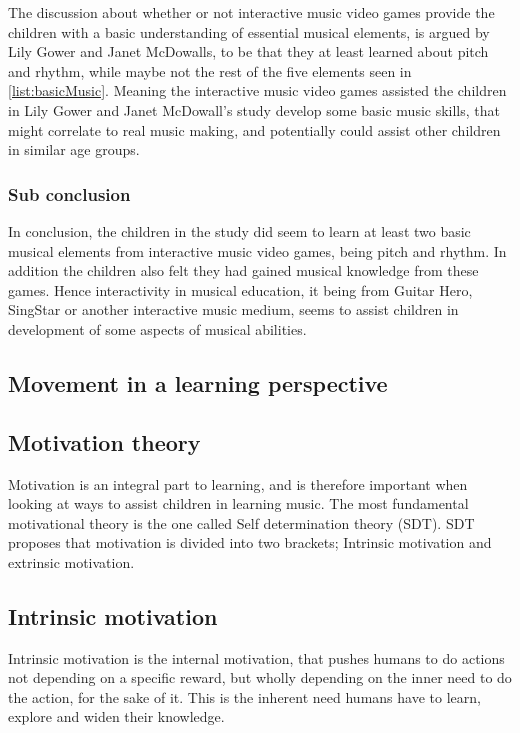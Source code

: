{The discussion about whether or not interactive music video games provide the children with a basic understanding of essential musical elements, is argued by Lily Gower and Janet McDowalls, to be that they at least learned about pitch and rhythm, while maybe not the rest of the five elements seen in \autoref{list:basicMusic}. Meaning the interactive music video games assisted the children in Lily Gower and Janet McDowall's study develop some basic music skills, that might correlate to real music making\cite[p.~99]{interactiveMusicVideoGames}, and potentially could assist other children in similar age groups.

\subsubsection*{Sub conclusion}
In conclusion, the children in the study\cite{interactiveMusicVideoGames} did seem to learn at least two basic musical elements from interactive music video games, being pitch and rhythm. In addition the children also felt they had gained musical knowledge from these games. Hence interactivity in musical education, it being from Guitar Hero, SingStar or another interactive music medium, seems to assist children in development of some aspects of musical abilities.
}
\subsection{Movement in a learning perspective}
	\cite{kinestheticMovement}
\subsection{Motivation theory}
Motivation is an integral part to learning\cite{motivationGameDesign}, and is therefore important when looking at ways to assist children in learning music. The most fundamental motivational theory is the one called Self determination theory (SDT)\cite{SDT}. SDT proposes that motivation is divided into two brackets; Intrinsic motivation and extrinsic motivation\cite{SDT}. 

\subsection*{Intrinsic motivation}
Intrinsic motivation is the internal motivation, that pushes humans to do actions not depending on a specific reward, but wholly depending on the inner need to do the action, for the sake of it\cite{SDT}.
This is the inherent need humans have to learn, explore and widen their knowledge\cite{SDT}.\\


